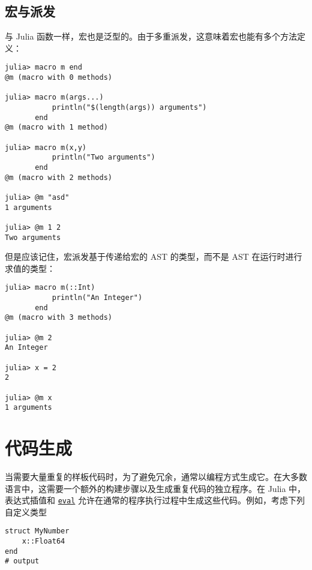 \subsection{宏与派发}



与 Julia 函数一样，宏也是泛型的。由于多重派发，这意味着宏也能有多个方法定义：




\begin{verbatim}
julia> macro m end
@m (macro with 0 methods)

julia> macro m(args...)
           println("$(length(args)) arguments")
       end
@m (macro with 1 method)

julia> macro m(x,y)
           println("Two arguments")
       end
@m (macro with 2 methods)

julia> @m "asd"
1 arguments

julia> @m 1 2
Two arguments
\end{verbatim}



但是应该记住，宏派发基于传递给宏的 AST 的类型，而不是 AST 在运行时进行求值的类型：




\begin{verbatim}
julia> macro m(::Int)
           println("An Integer")
       end
@m (macro with 3 methods)

julia> @m 2
An Integer

julia> x = 2
2

julia> @m x
1 arguments
\end{verbatim}



\hypertarget{4927517878935278303}{}


\section{代码生成}



当需要大量重复的样板代码时，为了避免冗余，通常以编程方式生成它。在大多数语言中，这需要一个额外的构建步骤以及生成重复代码的独立程序。在 Julia 中，表达式插值和 \hyperlink{7507639810592563424}{\texttt{eval}} 允许在通常的程序执行过程中生成这些代码。例如，考虑下列自定义类型




\begin{verbatim}
struct MyNumber
    x::Float64
end
# output

\end{verbatim}



